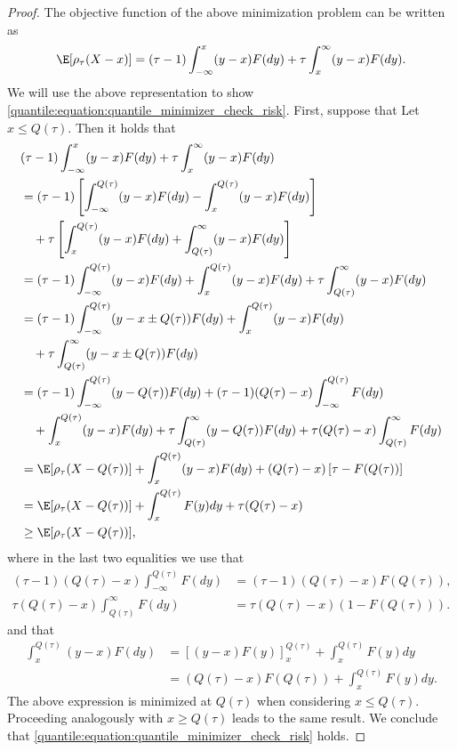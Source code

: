  
 \begin{proof}
  
The objective function of the above minimization problem can be written  as
\begin{equation}
\E[\rho_{\tau}(X-x)] = (\tau-1 )\int_{-\infty}^{x} (y-x) F(dy) + \tau \int_{x}^{\infty} (y-x) F(dy).
\end{equation}
We will use the above representation to show \eqref{quantile:equation:quantile_minimizer_check_risk}.
%
First, suppose that 
Let $x\leq Q(\tau)$. Then it holds that 
\begin{align*}
	  & (\tau-1 )\int_{-\infty}^{x} (y-x) F(dy) + \tau \int_{x}^{\infty} (y-x)F(dy)\\
	  & = (\tau-1 )\left[\int_{-\infty}^{Q(\tau)} (y-x) F(dy) -\int_x^{Q(\tau)} (y-x)F(dy)  \right]\\
	  & \quad  + \tau \left[ \int_{x}^{Q(\tau)} (y-x)F(dy) +\int_{Q(\tau)}^{\infty} (y-x)F(dy) \right] \\
	  & = (\tau-1 )\int_{-\infty}^{Q(\tau)} (y-x)F(dy) +  \int_{x}^{Q(\tau)} (y-x)F(dy) + \tau \int_{Q(\tau)}^{\infty} (y-x)F(dy)  \\
	  & = (\tau-1 )\int_{-\infty}^{Q(\tau)} (y-x \pm Q(\tau))F(dy) +  \int_{x}^{Q(\tau)} (y-x)F(dy) \\ & \quad + \tau \int_{Q(\tau)}^{\infty} (y-x \pm Q(\tau))F(dy) \\
	  & =   (\tau-1 )\int_{-\infty}^{Q(\tau)}(y- Q(\tau))F(dy) + (\tau-1 )(Q(\tau) - x )\int_{-\infty}^{Q(\tau)} F(dy) \\
	  & \quad + \int_{x}^{Q(\tau)} (y-x)F(dy)  + \tau  \int_{Q(\tau)}^{\infty}(y-Q(\tau))F(dy) + \tau (Q(\tau)-x)\int_{Q(\tau)}^{\infty} F(dy)\\
		  & =  \E[\rho_{\tau}(X-Q(\tau))] + \int_{x}^{Q(\tau)} (y-x)F(dy) + (Q(\tau) - x )\left[ \tau - F(Q(\tau)) \right]\\
	& = \E[\rho_{\tau}(X-Q(\tau))]  +  \int_{x}^{Q(\tau)} F(y)dy + \tau(Q(\tau)-x)\\
	& \geq \E[\rho_{\tau}(X-Q(\tau))], \label{quantile:equation:quantile_minimizes_check_risk_proof}
\end{align*}
where in the last two equalities we use that 
\begin{align}
	(\tau-1 )(Q(\tau) - x )\int_{-\infty}^{Q(\tau)} F(dy)   & =  (\tau-1 )(Q(\tau) - x )F(Q(\tau)), \\
	\tau (Q(\tau)-x)\int_{Q(\tau)}^{\infty} F(dy) & = \tau (Q(\tau)-x)(1-F(Q(\tau))).
\end{align} 
and that 
\begin{align}
	\int_{x}^{Q(\tau)} (y-x)F(dy) & = \left[(y-x)F(y) \right]_{x}^{Q(\tau)} + \int_{x}^{Q(\tau)}F(y)dy\\
	& =  (Q(\tau)-x)F(Q(\tau)) + \int_{x}^{Q(\tau)} F(y)dy.
\end{align}
The above expression is minimized at $Q(\tau)$ when considering $x\leq Q(\tau)$. Proceeding analogously with $x\geq Q(\tau)$ leads to the same result.
%
We conclude that \eqref{quantile:equation:quantile_minimizer_check_risk} holds. 
\end{proof}
 
